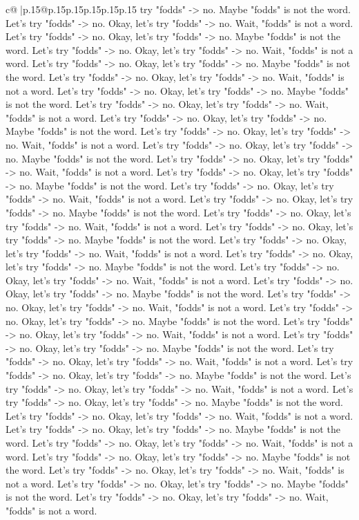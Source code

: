 \documentclass{article}
\begin{document}
{\begin{supertabular}{c@{$\;$}|p{.15\linewidth}@{}p{.15\linewidth}p{.15\linewidth}p{.15\linewidth}p{.15\linewidth}p{.15\linewidth}}
{{{try "fodds" {-}> no. Maybe "fodds" is not the word. Let's try "fodds" {-}> no. Okay, let's try "fodds" {-}> no. Wait, "fodds" is not a word. Let's try "fodds" {-}> no. Okay, let's try "fodds" {-}> no. Maybe "fodds" is not the word. Let's try "fodds" {-}> no. Okay, let's try "fodds" {-}> no. Wait, "fodds" is not a word. Let's try "fodds" {-}> no. Okay, let's try "fodds" {-}> no. Maybe "fodds" is not the word. Let's try "fodds" {-}> no. Okay, let's try "fodds" {-}> no. Wait, "fodds" is not a word. Let's try "fodds" {-}> no. Okay, let's try "fodds" {-}> no. Maybe "fodds" is not the word. Let's try "fodds" {-}> no. Okay, let's try "fodds" {-}> no. Wait, "fodds" is not a word. Let's try "fodds" {-}> no. Okay, let's try "fodds" {-}> no. Maybe "fodds" is not the word. Let's try "fodds" {-}> no. Okay, let's try "fodds" {-}> no. Wait, "fodds" is not a word. Let's try "fodds" {-}> no. Okay, let's try "fodds" {-}> no. Maybe "fodds" is not the word. Let's try "fodds" {-}> no. Okay, let's try "fodds" {-}> no. Wait, "fodds" is not a word. Let's try "fodds" {-}> no. Okay, let's try "fodds" {-}> no. Maybe "fodds" is not the word. Let's try "fodds" {-}> no. Okay, let's try "fodds" {-}> no. Wait, "fodds" is not a word. Let's try "fodds" {-}> no. Okay, let's try "fodds" {-}> no. Maybe "fodds" is not the word. Let's try "fodds" {-}> no. Okay, let's try "fodds" {-}> no. Wait, "fodds" is not a word. Let's try "fodds" {-}> no. Okay, let's try "fodds" {-}> no. Maybe "fodds" is not the word. Let's try "fodds" {-}> no. Okay, let's try "fodds" {-}> no. Wait, "fodds" is not a word. Let's try "fodds" {-}> no. Okay, let's try "fodds" {-}> no. Maybe "fodds" is not the word. Let's try "fodds" {-}> no. Okay, let's try "fodds" {-}> no. Wait, "fodds" is not a word. Let's try "fodds" {-}> no. Okay, let's try "fodds" {-}> no. Maybe "fodds" is not the word. Let's try "fodds" {-}> no. Okay, let's try "fodds" {-}> no. Wait, "fodds" is not a word. Let's try "fodds" {-}> no. Okay, let's try "fodds" {-}> no. Maybe "fodds" is not the word. Let's try "fodds" {-}> no. Okay, let's try "fodds" {-}> no. Wait, "fodds" is not a word. Let's try "fodds" {-}> no. Okay, let's try "fodds" {-}> no. Maybe "fodds" is not the word. Let's try "fodds" {-}> no. Okay, let's try "fodds" {-}> no. Wait, "fodds" is not a word. Let's try "fodds" {-}> no. Okay, let's try "fodds" {-}> no. Maybe "fodds" is not the word. Let's try "fodds" {-}> no. Okay, let's try "fodds" {-}> no. Wait, "fodds" is not a word. Let's try "fodds" {-}> no. Okay, let's try "fodds" {-}> no. Maybe "fodds" is not the word. Let's try "fodds" {-}> no. Okay, let's try "fodds" {-}> no. Wait, "fodds" is not a word. Let's try "fodds" {-}> no. Okay, let's try "fodds" {-}> no. Maybe "fodds" is not the word. Let's try "fodds" {-}> no. Okay, let's try "fodds" {-}> no. Wait, "fodds" is not a word. Let's try "fodds" {-}> no. Okay, let's try "fodds" {-}> no. Maybe "fodds" is not the word. Let's try "fodds" {-}> no. Okay, let's try "fodds" {-}> no. Wait, "fodds" is not a word. Let's try "fodds" {-}> no. Okay, let's try "fodds" {-}> no. Maybe "fodds" is not the word. Let's try "fodds" {-}> no. Okay, let's try "fodds" {-}> no. Wait, "fodds" is not a word. }}}
\end{supertabular}}
\end{document}
